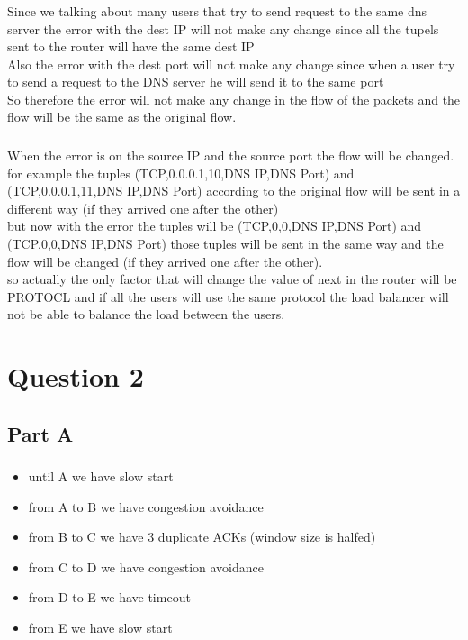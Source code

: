 \documentclass{article}
\begin{document}
\subsubsection{}
Since we talking about many users that try to send request to the same dns server the error with the dest IP will not make any change since all the tupels sent to the router will have the same dest IP\\
Also the error with the dest port will not make any change since when a user try to send a request to the DNS server he will send it to the same port\\
So therefore the error will not make any change in the flow of the packets and the flow will be the same as the original flow.

\subsubsection{}
When the error is on the source IP and the source port the flow will be changed. for example the tuples (TCP,0.0.0.1,10,DNS IP,DNS Port) and (TCP,0.0.0.1,11,DNS IP,DNS Port) according to the original flow will be sent in a different way (if they arrived one after the other)\\
but now with the error the tuples will be (TCP,0,0,DNS IP,DNS Port) and (TCP,0,0,DNS IP,DNS Port) those tuples will be sent in the same way and the flow will be changed (if they arrived one after the other).\\
so actually the only factor that will change the value of next in the router will be PROTOCL and if all the users will use the same protocol the load balancer will not be able to balance the load between the users.

\section{Question 2}

\subsection{Part A}
\subsubsection{}
\begin{itemize}
    \item until A we have slow start
    \item from A to B we have congestion avoidance
    \item from B to C we have 3 duplicate ACKs (window size is halfed)
    \item from C to D we have congestion avoidance 
    \item from D to E we have timeout
    \item from E we have slow start
\end{itemize}
\end{document}
